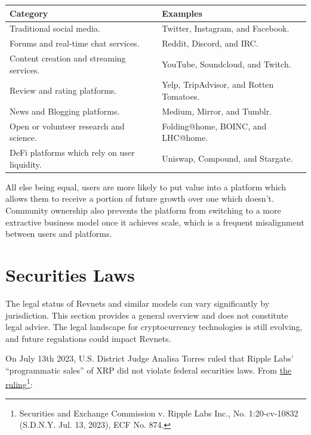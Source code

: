 \documentclass{article}
\begin{document}
\begin{table}[h]
  \centering
  \begin{tabular}{|l|l|}
    \hline \textbf{Category} & \textbf{Examples} \\
    \hline Traditional social media. & Twitter, Instagram, and Facebook. \\
    \hline Forums and real-time chat services. & Reddit, Discord, and IRC. \\
    \hline Content creation and streaming services. & YouTube, Soundcloud, and Twitch. \\
    \hline Review and rating platforms. & Yelp, TripAdvisor, and Rotten Tomatoes. \\
    \hline News and Blogging platforms. & Medium, Mirror, and Tumblr. \\
    \hline Open or volunteer research and science. & Folding@home, BOINC, and LHC@home. \\
    \hline DeFi platforms which rely on user liquidity. & Uniswap, Compound, and Stargate. \\
    \hline
  \end{tabular}
\end{table}

All else being equal, users are more likely to put value into a platform which allows them to receive a portion of future growth over one which doesn't. Community ownership also prevents the platform from switching to a more extractive business model once it achieves scale, which is a frequent misalignment between users and platforms.

\section{Securities Laws}

The legal status of Revnets and similar models can vary significantly by jurisdiction. This section provides a general overview and does not constitute legal advice. The legal landscape for cryptocurrency technologies is still evolving, and future regulations could impact Revnets.

On July 13th 2023, U.S. District Judge Analisa Torres ruled that Ripple Labs' ``programmatic sales'' of XRP did not violate federal securities laws. From \href{https://storage.courtlistener.com/recap/gov.uscourts.nysd.551082/gov.uscourts.nysd.551082.874.0_5.pdf}{the ruling}\footnote{Securities and Exchange Commission v. Ripple Labs Inc., No. 1:20-cv-10832 (S.D.N.Y. Jul. 13, 2023), ECF No. 874.}:
\end{document}
